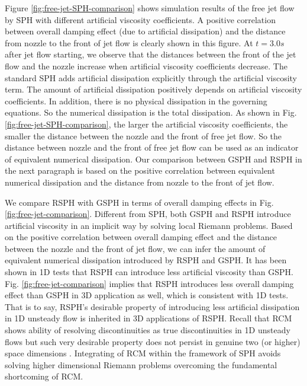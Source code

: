Figure \ref{fig:free-jet-SPH-comparison} shows simulation results of the free jet flow by SPH with different artificial viscosity coefficients. A positive correlation between overall damping effect (due to artificial dissipation) and the distance from nozzle to the front of jet flow is clearly shown in this figure. At $t=3.0 s$ after jet flow starting, we observe that the distances between the front of the jet flow and the nozzle increase when artificial viscosity coefficients decrease. The standard SPH adds artificial dissipation explicitly through the artificial viscosity term. The amount of artificial dissipation positively depends on artificial viscosity coefficients. In addition, there is no physical dissipation in the governing equations. So the numerical dissipation is the total dissipation. As shown in Fig. \ref{fig:free-jet-SPH-comparison}, the larger the artificial viscosity coefficients, the smaller the distance between the nozzle and the front of free jet flow. So the distance between nozzle and the front of free jet flow can be used as an indicator of equivalent numerical dissipation.
Our comparison between GSPH and RSPH in the next paragraph is based on the positive correlation between equivalent numerical dissipation and the distance from nozzle to the front of jet flow.

We compare RSPH with GSPH in terms of overall damping effects in Fig. \ref{fig:free-jet-comparison}. Different from SPH, both GSPH and RSPH introduce artificial viscosity in an implicit way by solving local Riemann problems. Based on the positive correlation between overall damping effect and the distance between the nozzle and the front of jet flow, we can infer the amount of equivalent numerical dissipation introduced by RSPH and GSPH. It has been shown in 1D tests that RSPH can introduce less artificial viscosity than GSPH. Fig. \ref{fig:free-jet-comparison} implies that RSPH introduces less overall damping effect than GSPH in 3D application as well, which is consistent with 1D tests. That is to say, RSPH's desirable property of introducing less artificial dissipation in 1D unsteady flow is inherited in 3D applications of RSPH. Recall that RCM shows ability of resolving discontinuities as true discontinuities in 1D unsteady flows but such very desirable property does not persist in genuine two (or higher) space dimensions \citep{colella1982glimm}. Integrating of RCM within the framework of SPH avoids solving higher dimensional Riemann problems overcoming the fundamental shortcoming of RCM.

